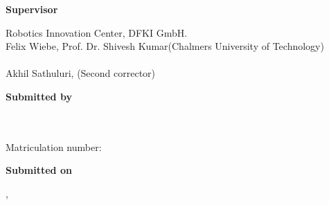{\begin{textblock*}{1\textwidth}
	\ifthenelse{\equal{\themenstellerlehrstuhl}{\betreutvonlehrstuhl}}
	{%
		\ifthenelse{\equal{\themensteller}{\betreutvonperson}}{}
		{%
	\vspace*{2mm}
	\textbf{Supervisor}\tab\hspace{-3cm}
	\begin{minipage}[t]{\textwidth-\CurrentLineWidth}
		Robotics Innovation Center, DFKI GmbH. \\
		Felix Wiebe, Prof. Dr. Shivesh Kumar(Chalmers University of Technology)\\
		\betreutvonlehrstuhl\\
		Akhil Sathuluri, \betreutvonzweitkorrektor{} (Second corrector)
	\end{minipage}
	}}{}
	
	\vspace*{2mm}
	\textbf{Submitted by}\tab\hspace{-3cm}
	\begin{minipage}[t]{\textwidth-\CurrentLineWidth}
		\derauthor\\
		\adresse\\
		Matriculation number: \matrikelnr\\
		\emailadresse\strut
	\end{minipage}
	
	\vspace*{2mm}
	\textbf{Submitted on}\tab\hspace{-3cm}
	\begin{minipage}[t]{\textwidth-\CurrentLineWidth}
		\eingereichtamort, \eingereichtamdatum\strut
	\end{minipage}
\end{textblock*}

}

\cleardoubleemptypage

